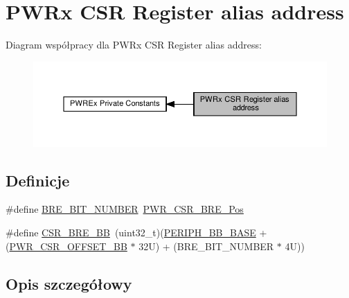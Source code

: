 \hypertarget{group___p_w_r_ex___c_s_r__register__alias}{}\section{P\+W\+Rx C\+SR Register alias address}
\label{group___p_w_r_ex___c_s_r__register__alias}
Diagram współpracy dla P\+W\+Rx C\+SR Register alias address\+:\nopagebreak
\begin{figure}[H]
\begin{center}
\leavevmode
\includegraphics[width=350pt]{group___p_w_r_ex___c_s_r__register__alias}
\end{center}
\end{figure}
\subsection*{Definicje}
\begin{DoxyCompactItemize}
\item 
\#define \hyperlink{group___p_w_r_ex___c_s_r__register__alias_gabe84749fda066b71a64a1eec61032181}{B\+R\+E\+\_\+\+B\+I\+T\+\_\+\+N\+U\+M\+B\+ER}~\hyperlink{group___peripheral___registers___bits___definition_gaa593af0ab76fabc71e48dce7b04f8acf}{P\+W\+R\+\_\+\+C\+S\+R\+\_\+\+B\+R\+E\+\_\+\+Pos}
\item 
\#define \hyperlink{group___p_w_r_ex___c_s_r__register__alias_ga1451a5ec810860a7c2e28c23f0c0e928}{C\+S\+R\+\_\+\+B\+R\+E\+\_\+\+BB}~(uint32\+\_\+t)(\hyperlink{group___peripheral__memory__map_gaed7efc100877000845c236ccdc9e144a}{P\+E\+R\+I\+P\+H\+\_\+\+B\+B\+\_\+\+B\+A\+SE} + (\hyperlink{group___p_w_r__register__alias__address_gaa9477acfcacc4610533df164c94ad6fd}{P\+W\+R\+\_\+\+C\+S\+R\+\_\+\+O\+F\+F\+S\+E\+T\+\_\+\+BB} $\ast$ 32\+U) + (\+B\+R\+E\+\_\+\+B\+I\+T\+\_\+\+N\+U\+M\+B\+E\+R $\ast$ 4\+U))
\end{DoxyCompactItemize}


\subsection{Opis szczegółowy}


